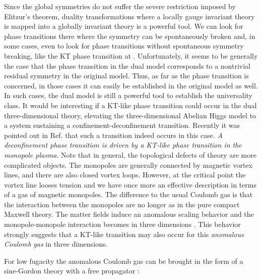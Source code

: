 \documentclass[a4paper,showpacs,preprintnumbers,amsmath,amssymb,prl,twocolumn]{revtex4}
\begin{document}
Since the global symmetries do not suffer the severe restriction 
imposed by Elitzur's theorem, duality transformations where a locally 
gauge invariant theory is mapped into a globally invariant theory is a 
powerful tool. We can look for phase transitions there where the symmetry 
can be spontaneously broken and, in some cases, even to look 
for phase transitions without spontaneous symmetry breaking, 
like the KT phase transition at \coordHE{}. Unfortunately, 
it seems to be generally the case that the phase transition 
in the dual model corresponds to a nontrivial residual 
symmetry in the original model. Thus, as far as the phase 
transition is concerned, in those cases it can easily be established 
in the original model as well. In such cases, the dual model is still  
a powerful tool to establish the universality class. It would 
be interesting if a KT-like phase transition could occur in the dual 
three-dimensional theory, elevating  the three-dimensional \coordHE{} Abelian 
Higgs model to a system sustaining a confinement-deconfinement transition. 
Recently it was pointed out in Ref. \cite{KNS} that such a transition 
indeed occurs in this case. {\it A deconfinement phase transition is 
driven by a KT-like phase transition in the monopole plasma}. 
Note that in general, the topological defects of theory are more 
complicated objects. The monopoles are generally connected 
by magnetic vortex lines, and there are also closed vortex 
loops. However, at the critical point the vortex line looses 
tension and we have once more an effective description in terms of 
a gas of magnetic monopoles. The difference to the usual Coulomb 
gas is that the interaction between the monopoles are no longer 
\coordHE{} as in the pure compact Maxwell theory. The matter 
fields induce an anomalous scaling behavior and the monopole-monopole 
interaction becomes \coordHE{} in three dimensions \cite{KNS,KNS1}. 
This behavior strongly suggests that a KT-like transition may also 
occur for this {\it anomalous Coulomb gas} in three dimensions. 

For low fugacity the anomalous Coulomb gas can be brought in the form 
of a sine-Gordon theory with a \coordHE{} free propagator 
\cite{KNS,KNS1}:
\end{document}

